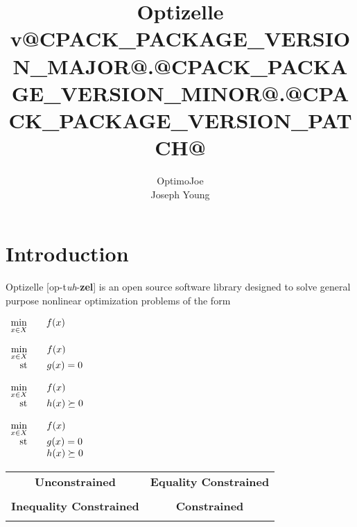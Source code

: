 \documentclass{report}
\title{Optizelle v@CPACK_PACKAGE_VERSION_MAJOR@.@CPACK_PACKAGE_VERSION_MINOR@.@CPACK_PACKAGE_VERSION_PATCH@}
\author{OptimoJoe\\Joseph Young}
\date{}
\newcommand{\st}{\textnormal{st}}
\begin{document}


\maketitle
\tableofcontents

\chapter{Introduction}

        Optizelle [op-t\textit{\!uh}-{\bf zel}] is an open source software library designed to solve general purpose nonlinear optimization problems of the form
    \begin{lrbox}{\boxUnconstrained}
        $\begin{array}[t]{rcl}
            \min\limits_{x\in X} && f(x)
        \end{array}$
    \end{lrbox}
    \begin{lrbox}{\boxEqualityConstrained}
        $\begin{array}[t]{rcl}
            \min\limits_{x\in X} && f(x)\\
            \st && g(x)=0
        \end{array}$
    \end{lrbox}
    \begin{lrbox}{\boxInequalityConstrained}
        $\begin{array}[t]{rcl}
            \min\limits_{x\in X} && f(x)\\
            \st && h(x)\succeq 0
        \end{array}$
    \end{lrbox}
    \begin{lrbox}{\boxConstrained}
        $\begin{array}[t]{rcl}
            \min\limits_{x\in X} && f(x)\\
            \st && g(x)=0\\
                && h(x)\succeq 0
        \end{array}$
    \end{lrbox}
    \begin{lrbox}{\boxOptimizationTypes}
        \begin{tabular}{|l|l|}\hline
            \multicolumn{1}{|c|}{\bf Unconstrained} &
            \multicolumn{1}{c|}{\bf Equality Constrained}\\
            \usebox{\boxUnconstrained} &
            \usebox{\boxEqualityConstrained} \\\hline
            \multicolumn{1}{|c|}{\bf Inequality Constrained} &
            \multicolumn{1}{c|}{\bf Constrained}\\
            \usebox{\boxInequalityConstrained} &
            \usebox{\boxConstrained} \\\hline
        \end{tabular}
    \end{lrbox}
\end{document}
